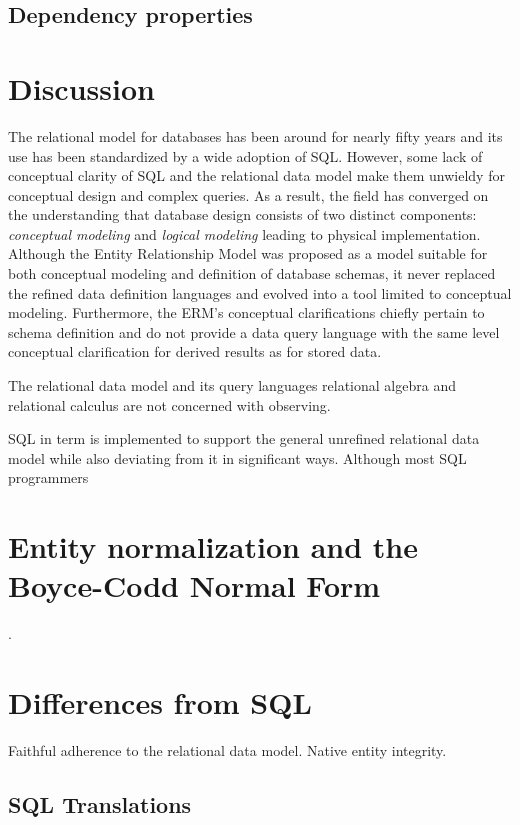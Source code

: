 \documentclass[letter,10pt]{article}
\begin{document}
\subsection{Dependency properties}

\section{Discussion}
The relational model for databases has been around for nearly fifty years and its use has been standardized by a wide adoption of SQL.
However, some lack of conceptual clarity of SQL and the relational data model make them unwieldy for conceptual design and complex queries. 
As a result, the field has converged on the understanding that database design consists of two distinct components: \emph{conceptual modeling} and \emph{logical modeling} leading to physical implementation. 
Although the Entity Relationship Model was proposed as a model suitable for both conceptual modeling and definition of database schemas, it never replaced the refined data definition languages and evolved into a tool limited to conceptual modeling.  
Furthermore, the ERM's conceptual clarifications chiefly pertain to schema definition and do not provide a data query language with the same level conceptual clarification for derived results as for stored data.

The relational data model and its query languages relational algebra and relational calculus are not concerned with observing. 

SQL in term is implemented to support the general unrefined relational data model while also deviating from it in significant ways. 
Although most SQL programmers 



\appendix
\section{Entity normalization and the Boyce-Codd Normal Form}.

\section{Differences from SQL}
Faithful adherence to the relational data model. 
Native entity integrity.

\subsection{SQL Translations}



\end{document}
